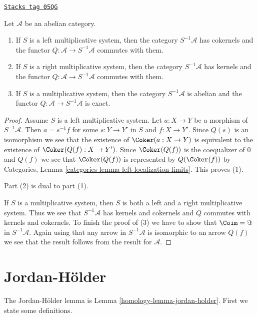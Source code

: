 \begin{lemma}
\label{homology-lemma-localization-abelian}
\href{https://stacks.math.columbia.edu/tag/05QG}{\texttt{Stacks tag 05QG}}

Let $\mathcal{A}$ be an abelian category.
\begin{enumerate}
\item If $S$ is a left multiplicative system, then
the category $S^{-1}\mathcal{A}$ has cokernels and the functor
$Q : \mathcal{A} \to S^{-1}\mathcal{A}$ commutes with them.
\item If $S$ is a right multiplicative system, then
the category $S^{-1}\mathcal{A}$ has kernels and the functor
$Q : \mathcal{A} \to S^{-1}\mathcal{A}$ commutes with them.
\item If $S$ is a multiplicative system, then the category
$S^{-1}\mathcal{A}$ is abelian and the functor
$Q : \mathcal{A} \to S^{-1}\mathcal{A}$ is exact.
\end{enumerate}
\end{lemma}

\begin{proof}
Assume $S$ is a left multiplicative system. Let $a : X \to Y$ be a morphism
of $S^{-1}\mathcal{A}$. Then $a = s^{-1}f$ for some $s : Y \to Y'$
in $S$ and $f : X \to Y'$. Since $Q(s)$ is an isomorphism we see that
the existence of $\Coker(a : X \to Y)$ is equivalent to the existence
of $\Coker(Q(f) : X \to Y')$. Since $\Coker(Q(f))$ is the
coequalizer of $0$ and $Q(f)$ we see that $\Coker(Q(f))$ is
represented by $Q(\Coker(f))$ by
Categories, Lemma \ref{categories-lemma-left-localization-limits}.
This proves (1).

\medskip\noindent
Part (2) is dual to part (1).

\medskip\noindent
If $S$ is a multiplicative system, then $S$ is both a left and a right
multiplicative system. Thus we see that $S^{-1}\mathcal{A}$ has
kernels and cokernels and $Q$ commutes with kernels and cokernels.
To finish the proof of (3) we have to show that $\Coim = \Im$ in
$S^{-1}\mathcal{A}$. Again using that any arrow in $S^{-1}\mathcal{A}$
is isomorphic to an arrow $Q(f)$ we see that the result follows
from the result for $\mathcal{A}$.
\end{proof}

\section{Jordan-H\"older}
\label{homology-section-jordan-holder}
The Jordan-H\"older lemma is Lemma \ref{homology-lemma-jordan-holder}.
First we state some definitions.

